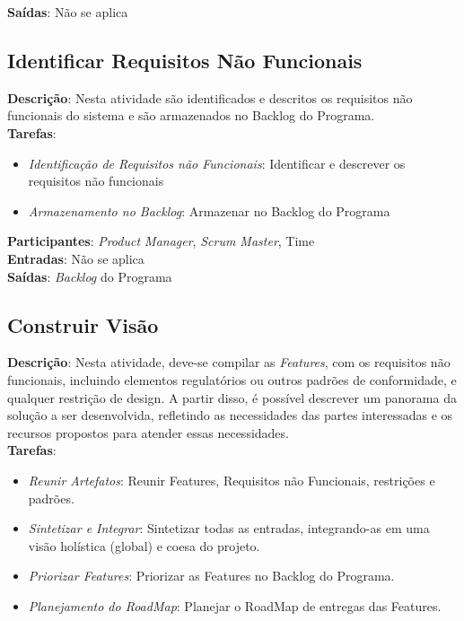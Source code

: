   \textbf{Saídas}:  Não se aplica\\

\subsection{Identificar Requisitos Não Funcionais}
  \textbf{Descrição}: Nesta atividade são identificados e descritos os requisitos não funcionais do sistema e são armazenados no Backlog do Programa.  \\

  \textbf{Tarefas}:
  \begin{itemize}
   \item \indent \textit{Identificação de Requisitos não Funcionais}: Identificar e descrever os requisitos não funcionais

   \item \indent \textit{Armazenamento no Backlog}: Armazenar no Backlog do Programa
  \end{itemize}

  \textbf{Participantes}: \textit{Product Manager}, \textit{Scrum Master}, Time \\

  \textbf{Entradas}:  Não se aplica\\

  \textbf{Saídas}:  \textit{Backlog} do Programa\\

\subsection{Construir Visão}
  \textbf{Descrição}: Nesta atividade, deve-se compilar as \textit{Features}, com os requisitos não funcionais, incluindo elementos
  regulatórios ou outros padrões de conformidade, e qualquer restrição de design. A partir disso, é possível descrever um panorama da solução a
  ser desenvolvida, refletindo as necessidades das partes interessadas e os recursos propostos para atender essas necessidades. \\

  \textbf{Tarefas}:
  \begin{itemize}
   \item \indent \textit{Reunir Artefatos}: Reunir Features, Requisitos não Funcionais, restrições e padrões.

   \item \indent \textit{Sintetizar e Integrar}: Sintetizar todas as entradas, integrando-as em uma visão holística (global) e coesa do projeto.

   \item \indent \textit{Priorizar Features}: Priorizar as Features no Backlog do Programa.

   \item \indent \textit{Planejamento do RoadMap}: Planejar o RoadMap de entregas das Features.
  \end{itemize}

